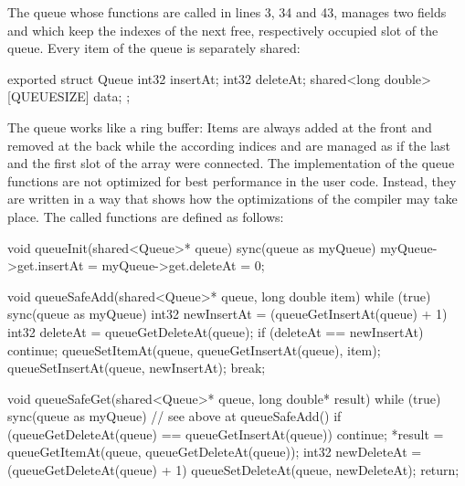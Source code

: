 The queue whose functions are called in lines 3, 34 and 43, manages two fields  and  which keep the indexes of the next free, respectively occupied slot of the queue. Every item of the queue is separately shared:
\begin{ccode}
exported struct Queue { 
  int32 insertAt; 
  int32 deleteAt; 
  shared<long double>[QUEUESIZE] data; 
};
\end{ccode}
The queue works like a ring buffer: Items are always added at the front and removed at the back while the according indices  and  are managed as if the last and the first slot of the array were connected. The implementation of the queue functions are not optimized for best performance in the user code. Instead, they are written in a way that shows how the optimizations of the compiler may take place. The called functions are defined as follows:

\begin{ccode}
void queueInit(shared<Queue>* queue) { 
  sync(queue as myQueue) { myQueue->get.insertAt = myQueue->get.deleteAt = 0; } 
}
 
void queueSafeAdd(shared<Queue>* queue, long double item) { 
  while (true) { 
    sync(queue as myQueue) {
      int32 newInsertAt = (queueGetInsertAt(queue) + 1) %
      int32 deleteAt = queueGetDeleteAt(queue); 
      if (deleteAt == newInsertAt) { continue; }
      queueSetItemAt(queue, queueGetInsertAt(queue), item); 
      queueSetInsertAt(queue, newInsertAt); 
      break; 
    } 
  }
}

void queueSafeGet(shared<Queue>* queue, long double* result) { 
  while (true) { 
    sync(queue as myQueue) { 
      // see above at queueSafeAdd() 
      if (queueGetDeleteAt(queue) == queueGetInsertAt(queue)) { continue; }
      *result = queueGetItemAt(queue, queueGetDeleteAt(queue)); 
      int32 newDeleteAt = (queueGetDeleteAt(queue) + 1) %
      queueSetDeleteAt(queue, newDeleteAt); 
      return; 
    } 
  } 
}
\end{ccode}

